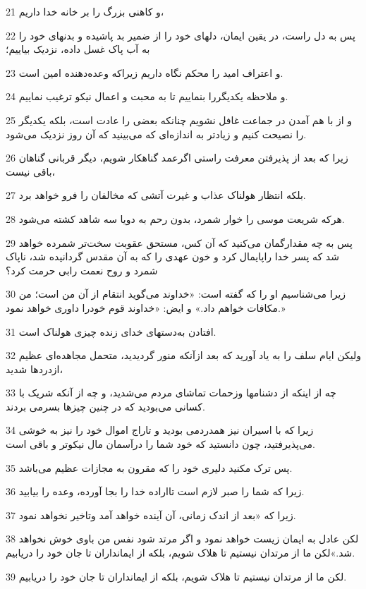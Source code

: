 \par 21 و کاهنی بزرگ را بر خانه خدا داریم،
\par 22 پس به دل راست، در یقین ایمان، دلهای خود را از ضمیر بد پاشیده و بدنهای خود را به آب پاک غسل داده، نزدیک بیاییم؛
\par 23 و اعتراف امید را محکم نگاه داریم زیراکه وعده‌دهنده امین است.
\par 24 و ملاحظه یکدیگررا بنماییم تا به محبت و اعمال نیکو ترغیب نماییم.
\par 25 و از با هم آمدن در جماعت غافل نشویم چنانکه بعضی را عادت است، بلکه یکدیگر را نصیحت کنیم و زیادتر به اندازه‌ای که می‌بینید که آن روز نزدیک می‌شود.
\par 26 زیرا که بعد از پذیرفتن معرفت راستی اگرعمد گناهکار شویم، دیگر قربانی گناهان باقی نیست،
\par 27 بلکه انتظار هولناک عذاب و غیرت آتشی که مخالفان را فرو خواهد برد.
\par 28 هر‌که شریعت موسی را خوار شمرد، بدون رحم به دویا سه شاهد کشته می‌شود.
\par 29 پس به چه مقدارگمان می‌کنید که آن کس، مستحق عقوبت سخت‌تر شمرده خواهد شد که پسر خدا راپایمال کرد و خون عهدی را که به آن مقدس گردانیده شد، ناپاک شمرد و روح نعمت رابی حرمت کرد؟
\par 30 زیرا می‌شناسیم او را که گفته است: «خداوند می‌گوید انتقام از آن من است؛ من مکافات خواهم داد.» و ایض: «خداوند قوم خودرا داوری خواهد نمود.»
\par 31 افتادن به‌دستهای خدای زنده چیزی هولناک است.
\par 32 ولیکن ایام سلف را به یاد آورید که بعد ازآنکه منور گردیدید، متحمل مجاهده‌ای عظیم ازدردها شدید،
\par 33 چه از اینکه از دشنامها وزحمات تماشای مردم می‌شدید، و چه از آنکه شریک با کسانی می‌بودید که در چنین چیزها بسرمی بردند.
\par 34 زیرا که با اسیران نیز همدردمی بودید و تاراج اموال خود را نیز به خوشی می‌پذیرفتید، چون دانستید که خود شما را درآسمان مال نیکوتر و باقی است.
\par 35 پس ترک مکنید دلیری خود را که مقرون به مجازات عظیم می‌باشد.
\par 36 زیرا که شما را صبر لازم است تااراده خدا را بجا آورده، وعده را بیابید.
\par 37 زیرا که «بعد از اندک زمانی، آن آینده خواهد آمد وتاخیر نخواهد نمود.
\par 38 لکن عادل به ایمان زیست خواهد نمود و اگر مرتد شود نفس من باوی خوش نخواهد شد.»لکن ما از مرتدان نیستیم تا هلاک شویم، بلکه از ایمانداران تا جان خود را دریابیم.
\par 39 لکن ما از مرتدان نیستیم تا هلاک شویم، بلکه از ایمانداران تا جان خود را دریابیم.

